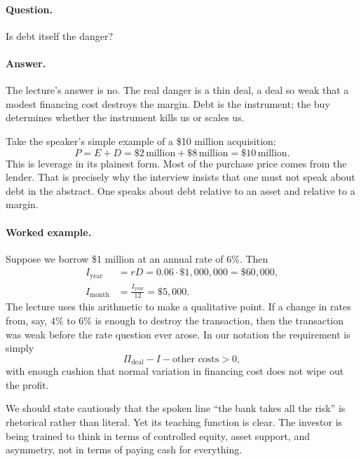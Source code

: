 \paragraph{Question.} Is debt itself the danger?

\paragraph{Answer.} The lecture's answer is no. The real danger is a thin deal, a deal so weak that a modest financing cost destroys the margin. Debt is the instrument; the buy determines whether the instrument kills us or scales us.

Take the speaker's simple example of a \$10 million acquisition:
\begin{equation}
P = E + D = \$2\,\text{million} + \$8\,\text{million} = \$10\,\text{million}.
\end{equation}
This is leverage in its plainest form. Most of the purchase price comes from the lender. That is precisely why the interview insists that one must not speak about debt in the abstract. One speaks about debt relative to an asset and relative to a margin.

\paragraph{Worked example.}
Suppose we borrow \$1 million at an annual rate of $6\%$. Then
\begin{align}
I_{\text{year}} &= rD = 0.06 \cdot \$1{,}000{,}000 = \$60{,}000,\\
I_{\text{month}} &= \frac{I_{\text{year}}}{12} = \$5{,}000.
\end{align}
The lecture uses this arithmetic to make a qualitative point. If a change in rates from, say, $4\%$ to $6\%$ is enough to destroy the transaction, then the transaction was weak before the rate question ever arose. In our notation the requirement is simply
\begin{equation}
\Pi_{\text{deal}} - I - \text{other costs} > 0,
\end{equation}
with enough cushion that normal variation in financing cost does not wipe out the profit.

We should state cautiously that the spoken line ``the bank takes all the risk'' is rhetorical rather than literal. Yet its teaching function is clear. The investor is being trained to think in terms of controlled equity, asset support, and asymmetry, not in terms of paying cash for everything.

